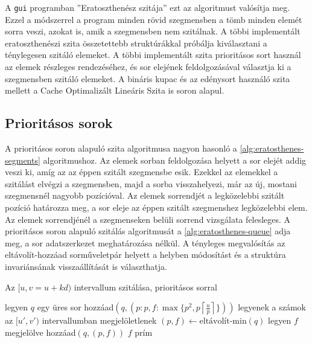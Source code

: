 A \texttt{gui} programban ''Eratoszthenész szitája'' ezt az algoritmust valósítja meg.
Ezzel a módszerrel a program minden rövid szegmensben a tömb minden elemét sorra veszi, azokat is, amik a szegmensben nem szitálnak.
A többi implementált eratoszthenészi szita összetettebb struktúrákkal próbálja kiválasztani a ténylegesen szitáló elemeket.
A többi implementált szita prioritásos sort használ az elemek részleges rendezéséhez, és sor elejének feldolgozásával választja ki a szegmensben szitáló elemeket.
A bináris kupac és az edénysort használó szita mellett a Cache Optimalizált Lineáris Szita is soron alapul.

\subsection{Prioritásos sorok}

A prioritásos soron alapuló szita algoritmusa nagyon hasonló a \ref{alg:eratosthenes-segments} algoritmushoz.
Az elemek sorban feldolgozása helyett a sor elejét addig veszi ki, amíg az az éppen szitált szegmensbe esik.
Ezekkel az elemekkel a szitálást elvégzi a szegmensben, majd a sorba visszahelyezi, már az új, mostani szegmensnél nagyobb pozícióval.
Az elemek sorrendjét a legközelebbi szitált pozíció határozza meg, a sor eleje az éppen szitált szegmenshez legközelebbi elem.
Az elemek sorrendjénél a szegmenseken belüli sorrend vizsgálata felesleges.
A prioritásos soron alapuló szitálás algoritmusát a \ref{alg:eratosthenes-queue} adja meg, a sor adatszerkezet meghatározása nélkül.
A tényleges megvalósítás az eltávolít-hozzáad sorműveletpár helyett a helyben módosítást és a struktúra invariánsának visszaállítását is választhatja.

\begin{algorithm}
\caption{Az $[u, v=u+kd)$ intervallum szitálása, prioritásos sorral}
\label{alg:eratosthenes-queue}
\begin{algorithmic}[1]
\State legyen $q$ egy üres sor
	\State hozzáad$(q, (p: p, f: \max \lbrace p^2, p \left \lceil{\frac{u}{p}}\right \rceil \rbrace ))$
\EndFor
{}
	\State legyenek a számok az $[u', v')$ intervallumban megjelöletlenek
		\State $(p, f) \gets \textrm{eltávolít-min}(q)$
			\State legyen $f$ megjelölve
		\EndFor
		\State hozzáad$(q, (p, f))$
	\EndWhile
	\For{$f \in [u', v')$}
			\State $f$ prím
		\EndIf
	\EndFor
\EndFor
\end{algorithmic}
\end{algorithm}

